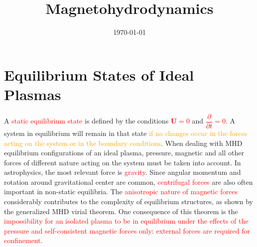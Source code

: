 \documentclass[12pt,a4paper]{article}
\title{Magnetohydrodynamics}
\author{}
\date{\today}
\renewcommand{\vec}[1]{\boldsymbol{#1}}
\newcounter{theo}[section]\setcounter{theo}{0}
\begin{document}
\maketitle
\section{Equilibrium States of Ideal Plasmas}
A \textcolor{red}{static equilibrium state} is defined by the conditions \textcolor{red}{$\vec{U} = 0$} and \textcolor{red}{$\dfrac{\partial }{\partial t} = 0$}. A system in equilibrium will remain in that state \textcolor{orange}{if no changes occur in the forces acting on the system or in the boundary conditions}. When dealing with MHD equilibrium configurations of an ideal plasma, pressure, magnetic and all other forces of different nature acting on the system must be taken into account. In astrophysics, the most relevant force is \textcolor{red}{gravity}. Since angular momentum and rotation around gravitational center are common, \textcolor{red}{centrifugal forces} are also often important in non-static equilibria.  The \textcolor{red}{anisotropic nature of magnetic forces} considerably contributes to the complexity of equilibrium structures, as shown by the generalized MHD virial theorem. One consequence of this theorem is the \textcolor{red}{impossibility for an isolated plasma to be in equilibrium under the effects of the pressure and self-consistent magnetic forces only}: \textcolor{red}{external forces are required for confinement}.
\end{document}
